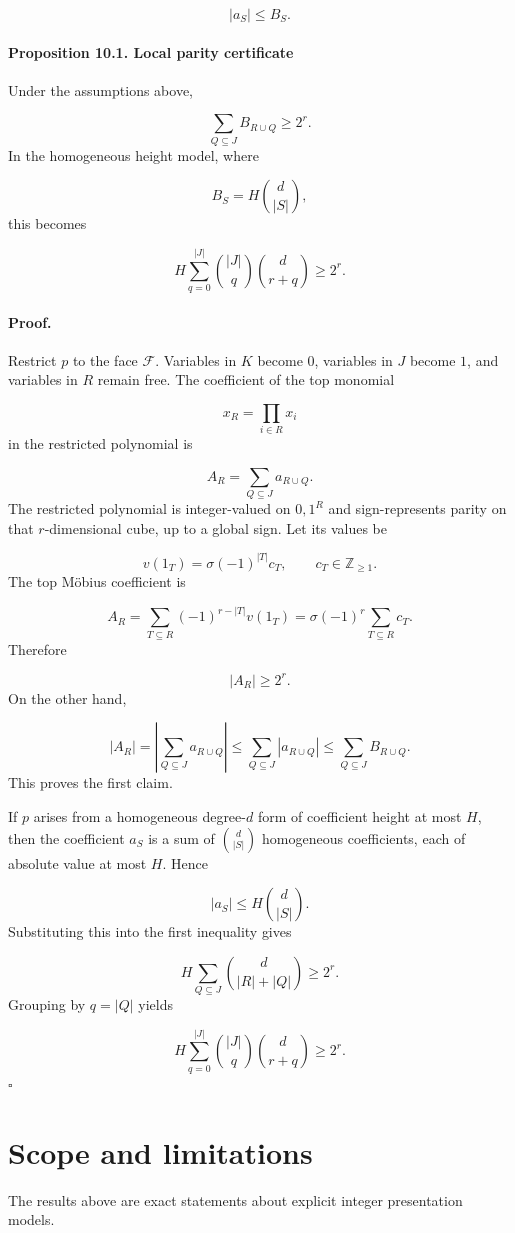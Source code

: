 \documentclass[11pt]{article}
\theoremstyle{definition}
\begin{document}
\[
|a_S|\le B_S.
\]
\paragraph{Proposition 10.1. Local parity certificate}
Under the assumptions above,

\[
\sum_{Q\subseteq J}B_{R\cup Q}\ge2^r.
\]
In the homogeneous height model, where

\[
B_S=H\binom d{|S|},
\]
this becomes

\[
H
\sum_{q=0}^{|J|}
\binom{|J|}{q}
\binom d{r+q}
\ge2^r.
\]
\paragraph{Proof.}
Restrict $p$ to the face $\mathcal F$. Variables in $K$ become $0$, variables in $J$ become $1$, and variables in $R$ remain free. The coefficient of the top monomial

\[
x_R=\prod_{i\in R}x_i
\]
in the restricted polynomial is

\[
A_R=
\sum_{Q\subseteq J}a_{R\cup Q}.
\]
The restricted polynomial is integer-valued on ${0,1}^R$ and sign-represents parity on that $r$-dimensional cube, up to a global sign. Let its values be

\[
v(1_T)
=
\sigma(-1)^{|T|}c_T,
\qquad
c_T\in\mathbb{Z}_{\ge1}.
\]
The top Möbius coefficient is

\[
A_R
=
\sum_{T\subseteq R}
(-1)^{r-|T|}v(1_T)
=
\sigma(-1)^r
\sum_{T\subseteq R}c_T.
\]
Therefore

\[
|A_R|\ge2^r.
\]
On the other hand,

\[
|A_R|
=
\left|
\sum_{Q\subseteq J}a_{R\cup Q}
\right|
\le
\sum_{Q\subseteq J}|a_{R\cup Q}|
\le
\sum_{Q\subseteq J}B_{R\cup Q}.
\]
This proves the first claim.

If $p$ arises from a homogeneous degree-$d$ form of coefficient height at most $H$, then the coefficient $a_S$ is a sum of $\binom d{|S|}$ homogeneous coefficients, each of absolute value at most $H$. Hence

\[
|a_S|\le H\binom d{|S|}.
\]
Substituting this into the first inequality gives

\[
H
\sum_{Q\subseteq J}
\binom d{|R|+|Q|}
\ge2^r.
\]
Grouping by $q=|Q|$ yields

\[
H
\sum_{q=0}^{|J|}
\binom{|J|}{q}
\binom d{r+q}
\ge2^r.
\]
\(\square\)
\section{Scope and limitations}
The results above are exact statements about explicit integer presentation models.
\end{document}
